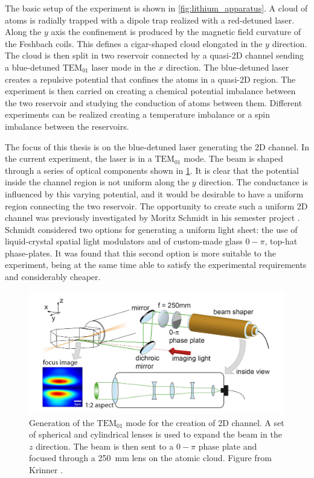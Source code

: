 The basic setup of the experiment is shown in \cref{fig:lithium_apparatus}. A cloud of atoms is radially trapped with a dipole trap realized with a red-detuned laser. Along the $y$ axis the confinement is produced by the magnetic field curvature of the Feshbach coils. This defines a cigar-shaped cloud elongated in the $y$ direction. The cloud is then split in two reservoir connected by a quasi-2D channel sending a blue-detuned $\text{TEM}_{01}$ laser mode in the $x$ direction. The blue-detuned laser creates a repulsive potential that confines the atoms in a quasi-2D region. The experiment is then carried on creating a chemical potential imbalance between the two reservoir and studying the conduction of atoms between them. Different experiments can be realized creating a temperature imbalance or a spin imbalance between the reservoirs.

The focus of this thesis is on the blue-detuned laser generating the 2D channel. In the current experiment, the laser is in a $\text{TEM}_{01}$ mode. The beam is shaped through a series of optical components shown in \cref{fig:beam_shaper}. It is clear that the potential inside the channel region is not uniform along the $y$ direction. The conductance is influenced by this varying potential, and it would be desirable to have a uniform region connecting the two reservoir. The opportunity to create such a uniform 2D channel was previously investigated by Moritz Schmidt in his semester project \cite{schmidt2021}. Schmidt considered two options for generating a uniform light sheet: the use of liquid-crystal spatial light modulators and of custom-made glass $0-\pi$, top-hat phase-plates. It was found that this second option is more suitable to the experiment, being at the same time  able to satisfy the experimental requirements and considerably cheaper.

\begin{figure}
    \includegraphics[width=\textwidth]{chapters/chapter_1/figures/beam_shaper.png}
    \caption[short]{Generation of the $\text{TEM}_{01}$ mode for the creation of 2D channel. A set of spherical and cylindrical lenses is used to expand the beam in the $z$ direction. The beam is then sent to a $0-\pi$ phase plate and focused through a \SI{250}{mm} lens on the atomic cloud. Figure from Krinner \cite{krinner2015b}.}
    \label{fig:beam_shaper}
\end{figure}

